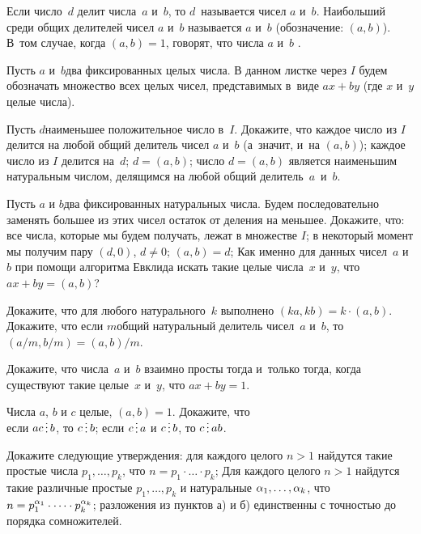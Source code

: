 \documentclass[a4paper,12pt]{article}
\begin{document}

Если число~$d$ делит числа~$a$ и~$b$, то $d$~называется  чисел $a$ и~$b$. Наибольший среди общих делителей чисел $a$ и~$b$ называется  $a$ и~$b$ (обозначение: $(a,b)$). В~том случае, когда $(a,b)=1$, говорят, что числа $a$ и~$b$ .

Пусть $a$ и~$b$\т два фиксированных целых числа.
В данном листке через $I$ будем обозначать множество всех целых чисел, 
представимых в~виде $ax+by$ (где $x$ и~$y$\т целые числа).


Пусть $d$\т наименьшее положительное число в~$I$. Докажите, что
каждое число из $I$ делится на любой общий делитель чисел $a$ и~$b$ (а~значит, и~на $(a,b)$);
каждое число из $I$ делится на~$d$;
$d=(a,b)$;
число $d=(a,b)$ является наименьшим натуральным числом, делящимся на любой общий делитель~$a$~и~$b$.



Пусть $a$ и $b$\т два фиксированных натуральных числа. Будем последовательно заменять большее из этих чисел остаток от деления на меньшее. Докажите, что:
все числа, которые мы будем получать, лежат в множестве $I$;
в некоторый момент мы получим пару $(d, 0)$, $d\ne 0$;
$(a,b)=d$;
Как именно для данных чисел~$a$ и~$b$ при помощи алгоритма Евклида искать такие целые числа~$x$ и~$y$, что $ax+by=(a,b)$?

Докажите, что для любого натурального~$k$ выполнено $(ka,kb)=k\cdot(a,b)$.\\
Докажите, что если $m$\т общий натуральный делитель чисел~$a$ и~$b$, то $(a/m,b/m)=(a,b)/m$.

Докажите, что числа~$a$ и~$b$ взаимно просты тогда и~только тогда, когда существуют такие целые~$x$ и~$y$, что $ax+by=1$.

Числа $a$, $b$ и $c$ целые, $(a,b) = 1$. Докажите, что \\
если $ac \dv b$,  то $c \dv b$;
если $c \dv a$ и $c \dv b$,  то $c \dv ab$.

 Докажите следующие утверждения:
 для каждого целого $n>1$ найдутся такие простые числа
$p_1,\dots,p_k$, что $n=p_1\cdot \dots \cdot  p_k$; %
 Для каждого целого $n>1$ найдутся такие
различные простые $p_1,\dots,p_k$ и натуральные $\alpha_1,\dots,\alpha_k$, что
$n=p_1^{\alpha_1}\cdot \dots \cdot p_k^{\alpha_k}$; %
 разложения из пунктов а) и б) единственны с точностью до порядка
сомножителей.
\end{document}
